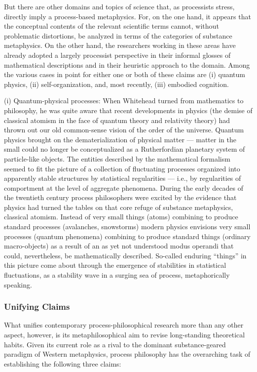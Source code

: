 But there are other domains and topics of science that, as processists stress, directly imply a process-based metaphysics. For, on the one hand, it appears that the conceptual contents of the relevant scientific terms cannot, without problematic distortions, be analyzed in terms of the categories of substance metaphysics. On the other hand, the researchers working in these areas have already adopted a largely processist perspective in their informal glosses of mathematical descriptions and in their heuristic approach to the domain. Among the various cases in point for either one or both of these claims are (i) quantum physics, (ii) self-organization, and, most recently, (iii) embodied cognition.

(i) Quantum-physical processes: When Whitehead turned from mathematics to philosophy, he was quite aware that recent developments in physics (the demise of classical atomism in the face of quantum theory and relativity theory) had thrown out our old common-sense vision of the order of the universe. Quantum physics brought on the dematerialization of physical matter — matter in the small could no longer be conceptualized as a Rutherfordian planetary system of particle-like objects. The entities described by the mathematical formalism seemed to fit the picture of a collection of fluctuating processes organized into apparently stable structures by statistical regularities — i.e., by regularities of comportment at the level of aggregate phenomena. During the early decades of the twentieth century process philosophers were excited by the evidence that physics had turned the tables on that core refuge of substance metaphysics, classical atomism. Instead of very small things (atoms) combining to produce standard processes (avalanches, snowstorms) modern physics envisions very small processes (quantum phenomena) combining to produce standard things (ordinary macro-objects) as a result of an as yet not understood modus operandi that could, nevertheless, be mathematically described. So-called enduring “things” in this picture come about through the emergence of stabilities in statistical fluctuations, as a stability wave in a surging sea of process, metaphorically speaking.

\subsubsection{Unifying Claims}

What unifies contemporary process-philosophical research more than any other aspect, however, is its metaphilosophical aim to revise long-standing theoretical habits. Given its current role as a rival to the dominant substance-geared paradigm of Western metaphysics, process philosophy has the overarching task of establishing the following three claims:

